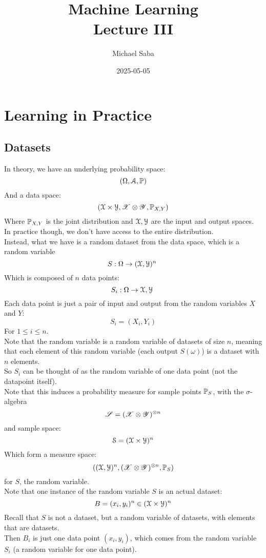 \documentclass[12pt]{article}
\title{%
    \Huge Machine Learning \\
    \Large Lecture III
}
\date{2025-05-05}
\author{Michael Saba}
\begin{document}
\maketitle
\newpage
\setlength{\parindent}{0pt}

\section*{Learning in Practice}

\subsection*{Datasets}

In theory, we have an underlying
probability space:
\[ (\Omega, \mathcal{A}, \mathbb{P}) \]
And a data space:
\[(\mathcal{X}\times \mathcal{Y}, \mathscr{X} \otimes \mathscr{Y}, 
\mathbb{P}_{X, Y})\]
Where $\mathbb{P}_{X, Y}$ is the joint distribution 
and $\mathcal{X}, \mathcal{Y}$
are the input and output spaces. \\

In practice though, we don't have access
to the entire distribution. \\

Instead, what we have is a random dataset
from the data space,
which is a random variable
\[ S: \Omega \to (\mathcal{X}, \mathcal{Y})^n \ \]
Which is composed of $n$ data points:
\[ S_i: \Omega \to \xcal, \ycal\ \]
Each data point is just a pair
of input and output from the random
variables $X$ and $Y$:
\[ S_i = (X_i, Y_i)\]
For $1 \leq i \leq n$. \\

Note that the random variable is
a random variable of datasets of size $n$,
meaning that each element of this
random variable (each output $S(\omega)$)
is a dataset with $n$ elements. \\

So $S_i$ can be thought of as the random
variable of one data point
(not the datapoint itself). \\

Note that this induces a probability
measure for sample points $\mathbb{P}_S$,
with the $\sigma$-algebra
\[ \mathscr{S} = (\mathscr{X} \otimes \mathscr{Y})^{\otimes n} \]
and sample space:
\[ \mathcal{S} = (\mathcal{X} \times \mathcal{Y})^n \]
Which form a measure space:
\[ ((\mathcal{X}, \mathcal{Y})^n,
(\mathscr{X} \otimes \mathscr{Y})^{\otimes n}, \mathbb{P}_S) \]
for $S$, the random variable. \\

Note that one instance of the random variable $S$
is an actual dataset:
\[ B = (x_i, y_i)^n 
\in (\mathcal{X}\times \mathcal{Y})^n \]
Recall that $S$ is not a dataset,
but a random variable of datasets,
with elements that are datasets. \\
Then $B_i$ is just one data point $(x_i, y_i)$,
which comes from the random variable
$S_i$ (a random variable for one data point). \\
\end{document}
